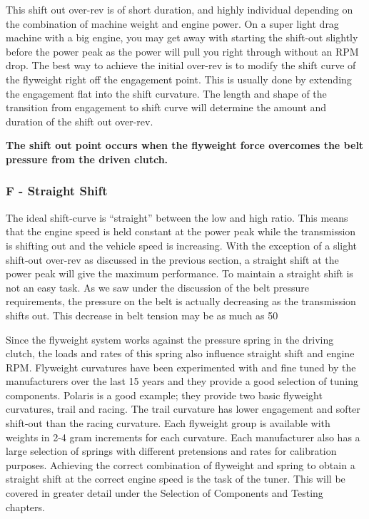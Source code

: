 \documentclass[12pt, titlepage]{article}
\begin{document}
This shift out over-rev is of short duration, and highly individual depending on the combination of machine weight and engine power. On a super light drag machine with a big engine, you may get away with starting the shift-out slightly before the power peak as the power will pull you right through without an RPM drop. The best way to achieve the initial over-rev is to modify the shift curve of the flyweight right off the engagement point. This is usually done by extending the engagement flat into the shift curvature. The length and shape of the transition from engagement to shift curve will determine the amount and duration of the shift out over-rev.

\textbf{The shift out point occurs when the flyweight force overcomes the belt pressure from the driven clutch.}

\subsubsection*{F - Straight Shift}

The ideal shift-curve is “straight” between the low and high ratio. This means that the engine speed is held constant at the power peak while the transmission is shifting out and the vehicle speed is increasing. With the exception of a slight shift-out over-rev as discussed in the previous section, a straight shift at the power peak will give the maximum performance. To maintain a straight shift is not an easy task. As we saw under the discussion of the belt pressure requirements, the pressure on the belt is actually decreasing as the transmission shifts out. This decrease in belt tension may be as much as 50%

Since the flyweight system works against the pressure spring in the driving clutch, the loads and rates of this spring also influence straight shift and engine RPM. Flyweight curvatures have been experimented with and fine tuned by the manufacturers over the last 15 years and they provide a good selection of tuning components. Polaris is a good example; they provide two basic flyweight curvatures, trail and racing. The trail curvature has lower engagement and softer shift-out than the racing curvature. Each flyweight group is available with weights in 2-4 gram increments for each curvature. Each manufacturer also has a large selection of springs with different pretensions and rates for calibration purposes. Achieving the correct combination of flyweight and spring to obtain a straight shift at the correct engine speed is the task of the tuner. This will be covered in greater detail under the Selection of Components and Testing chapters.
\end{document}
